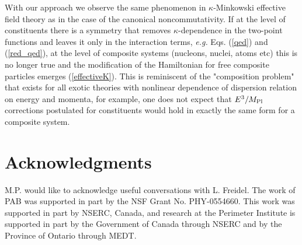 \documentclass[prl,tightenlines]{revtex4}
\begin{document}
With our approach we observe the same phenomenon in $\kappa$-Minkowski effective field theory as in the 
case of the canonical noncommutativity. If at the level of constituents there is a symmetry that removes 
$\kappa$-dependence in the two-point functions and leaves it only in the interaction terms, 
{\em e.g.} Eqs. (\ref{qed}) and (\ref{red_qed}), at the level of composite systems (nucleons, nuclei, atoms etc)
this is no longer true and the modification of the Hamiltonian for free composite particles emerges (\ref{effectiveK}).
This is reminiscent of the "composition problem" that exists for all 
exotic theories with nonlinear dependence of dispersion relation on energy and momenta, for example, one does not expect that
 $E^3/M_{\rm Pl}$ corrections postulated for constituents would hold in exactly the same form for a composite system. 
 

 









\section{Acknowledgments}
M.P. would like to acknowledge useful conversations with L. Freidel. 
The work of PAB was supported in part by the NSF Grant No. PHY-0554660. 
This work was supported in part by NSERC, Canada, and research at the Perimeter Institute
is supported in part by the Government of Canada 
through NSERC and by the Province of Ontario through MEDT.
\end{document}
